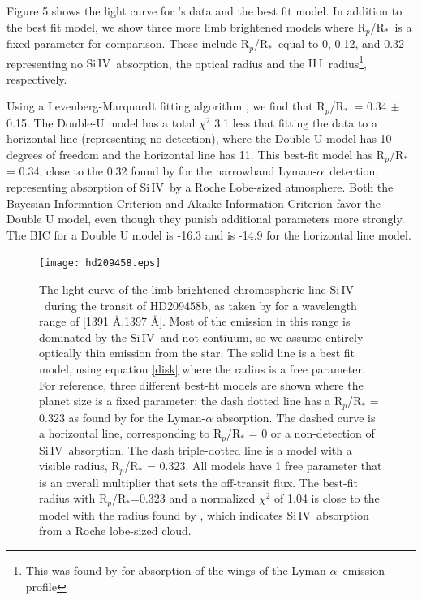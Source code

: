 \documentclass[twocolumn]{emulateapj}
\newcommand{\hi}{\ensuremath{\mathrm{H}\,\scriptstyle \mathrm{I}}}
\newcommand{\siIV}{\ensuremath{\mathrm{Si}\,\scriptstyle \mathrm{IV}}}
\newcommand{\p}{R$_p$/R$_*$}
\newcommand{\lya}{Lyman-$\alpha$}
\begin{document}
Figure 5
 shows the light curve for \citet{vidmad}'s data and the best fit model. In addition to the best fit model, we show three more limb brightened models where \p\ is a fixed parameter for comparison. These include \p\ equal to 0, 0.12, and 0.32 representing no \siIV\ absorption, the optical radius \citep{knutsonprop} and the \hi\ radius\footnote{This was found by \citet{vidmad} for absorption of the wings of the \lya\ emission profile}, respectively.

Using a Levenberg-Marquardt fitting algorithm \citep{mpfit}, we find that \p\ = 0.34 $\pm$ 0.15. 
The Double-U model has a total $\chi^2$ 3.1 less that fitting the data to
a horizontal line (representing no detection), where the Double-U model has 10 degrees of freedom and the horizontal line has 11. This best-fit model has
R$_p$/R$_*$ = 0.34, close to the 0.32 found by \citet{vidmad} for the narrowband \lya\ detection, representing absorption of \siIV\ by a Roche Lobe-sized atmosphere. Both the Bayesian Information Criterion and Akaike Information Criterion favor the Double U model, even though they punish additional parameters more strongly. The BIC for a Double U model is -16.3 and is -14.9 for the horizontal line model.


\begin{figure}[!ht]
\begin{center}
\texttt{[image: hd209458.eps]}
\caption{The light curve of the limb-brightened chromospheric line \siIV\ during the transit of HD209458b, as taken by \citet{vidmad} for a wavelength range of [1391 \AA,1397 \AA]. Most of the emission in this range is dominated by the \siIV\ and not contiuum, so we assume entirely optically thin emission from the star. The solid line is a best fit model, using equation \ref{disk} where the radius is a free parameter. For reference, three different best-fit models are shown where the planet size is a fixed parameter: the dash dotted line has a R$_p$/R$_*$ = 0.323 as found by \citet{vidmad} for the Lyman-$\alpha$ absorption. The dashed curve is a horizontal line, corresponding to R$_p$/R$_*$ = 0 or a non-detection of \siIV\ absorption. The dash triple-dotted line is a model with a visible radius, R$_p$/R$_*$ = 0.323. All models have 1 free parameter that is an overall multiplier that sets the off-transit flux. The best-fit radius with R$_p$/R$_*$=0.323 and a normalized $\chi^2$ of 1.04 is close to the model with the radius found by \citet{vidmad}, which indicates \siIV\ absorption from a Roche lobe-sized cloud. }
\end{center}
\label{lightc}
\end{figure}
\end{document}
